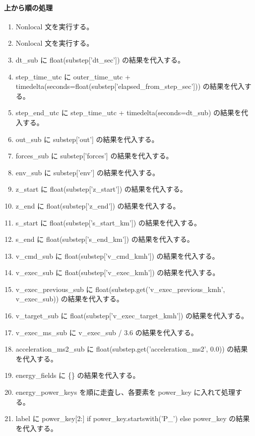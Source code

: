 \documentclass[a4paper,11pt]{article}
\begin{document}
            \paragraph{上から順の処理}
            \begin{enumerate}[leftmargin=1.8em]
            \item Nonlocal 文を実行する。
\item Nonlocal 文を実行する。
\item dt\_sub に float(substep['dt\_sec']) の結果を代入する。
\item step\_time\_utc に outer\_time\_utc + timedelta(seconds=float(substep['elapsed\_from\_step\_sec'])) の結果を代入する。
\item step\_end\_utc に step\_time\_utc + timedelta(seconds=dt\_sub) の結果を代入する。
\item out\_sub に substep['out'] の結果を代入する。
\item forces\_sub に substep['forces'] の結果を代入する。
\item env\_sub に substep['env'] の結果を代入する。
\item z\_start に float(substep['z\_start']) の結果を代入する。
\item z\_end に float(substep['z\_end']) の結果を代入する。
\item s\_start に float(substep['s\_start\_km']) の結果を代入する。
\item s\_end に float(substep['s\_end\_km']) の結果を代入する。
\item v\_cmd\_sub に float(substep['v\_cmd\_kmh']) の結果を代入する。
\item v\_exec\_sub に float(substep['v\_exec\_kmh']) の結果を代入する。
\item v\_exec\_previous\_sub に float(substep.get('v\_exec\_previous\_kmh', v\_exec\_sub)) の結果を代入する。
\item v\_target\_sub に float(substep['v\_exec\_target\_kmh']) の結果を代入する。
\item v\_exec\_ms\_sub に v\_exec\_sub / 3.6 の結果を代入する。
\item acceleration\_ms2\_sub に float(substep.get('acceleration\_ms2', 0.0)) の結果を代入する。
\item energy\_fields に \{\} の結果を代入する。
\item energy\_power\_keys を順に走査し、各要素を power\_key に入れて処理する。
\item   label に power\_key[2:] if power\_key.startswith('P\_') else power\_key の結果を代入する。

\end{enumerate}
\end{document}
